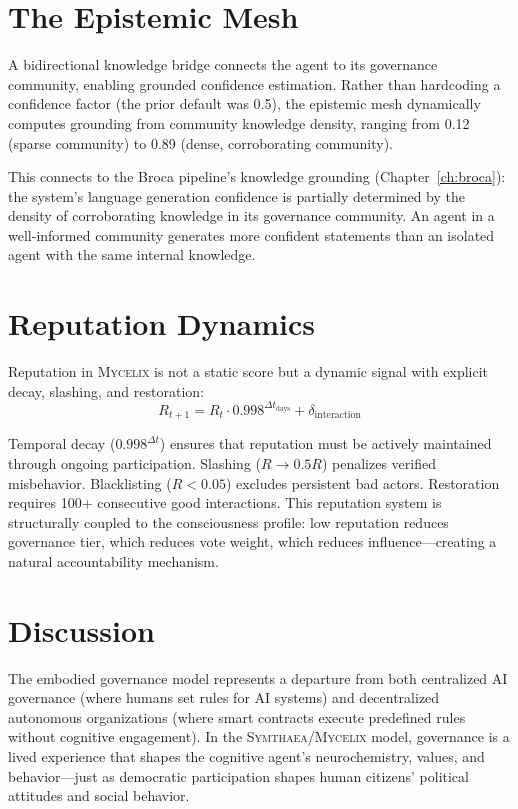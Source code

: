 \documentclass[12pt]{book}
\newcommand{\symthaea}{\textsc{Symthaea}}
\newcommand{\mycelix}{\textsc{Mycelix}}
\begin{document}
\section{The Epistemic Mesh}

A bidirectional knowledge bridge connects the agent to its governance community, enabling grounded confidence estimation. Rather than hardcoding a confidence factor (the prior default was 0.5), the epistemic mesh dynamically computes grounding from community knowledge density, ranging from 0.12 (sparse community) to 0.89 (dense, corroborating community).

This connects to the Broca pipeline's knowledge grounding (Chapter~\ref{ch:broca}): the system's language generation confidence is partially determined by the density of corroborating knowledge in its governance community. An agent in a well-informed community generates more confident statements than an isolated agent with the same internal knowledge.

\section{Reputation Dynamics}

Reputation in \mycelix{} is not a static score but a dynamic signal with explicit decay, slashing, and restoration:
\begin{equation}
R_{t+1} = R_t \cdot 0.998^{\Delta t_{\text{days}}} + \delta_{\text{interaction}}
\end{equation}

Temporal decay ($0.998^{\Delta t}$) ensures that reputation must be actively maintained through ongoing participation. Slashing ($R \to 0.5R$) penalizes verified misbehavior. Blacklisting ($R < 0.05$) excludes persistent bad actors. Restoration requires 100+ consecutive good interactions. This reputation system is structurally coupled to the consciousness profile: low reputation reduces governance tier, which reduces vote weight, which reduces influence---creating a natural accountability mechanism.

\section{Discussion}

The embodied governance model represents a departure from both centralized AI governance (where humans set rules for AI systems) and decentralized autonomous organizations (where smart contracts execute predefined rules without cognitive engagement). In the \symthaea{}/\mycelix{} model, governance is a lived experience that shapes the cognitive agent's neurochemistry, values, and behavior---just as democratic participation shapes human citizens' political attitudes and social behavior.
\end{document}
